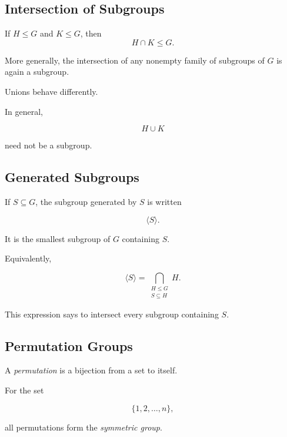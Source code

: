 \subsection{Intersection of Subgroups}
\label{subsec:intersection-subgroups}

\begin{theorem}
If \(H\leq G\) and \(K\leq G\), then
\[ H\cap K\leq G. \]
\end{theorem}

More generally, the intersection of any nonempty family of subgroups of \(G\)
is again a subgroup.

Unions behave differently.

In general,

\[ H\cup K \]

need not be a subgroup.

\subsection{Generated Subgroups}
\label{subsec:generated-subgroups}

If \(S\subseteq G\), the subgroup generated by \(S\) is written

\[ \langle S\rangle. \]

It is the smallest subgroup of \(G\) containing \(S\).

Equivalently,

\[ \langle S\rangle=\bigcap_{\substack{H\leq G\\S\subseteq H}}H. \]

This expression says to intersect every subgroup containing \(S\).

\subsection{Permutation Groups}
\label{subsec:permutation-groups}

A \emph{permutation} is a bijection from a set to itself.

For the set

\[ \{1,2,\ldots,n\}, \]

all permutations form the \emph{symmetric group}.

